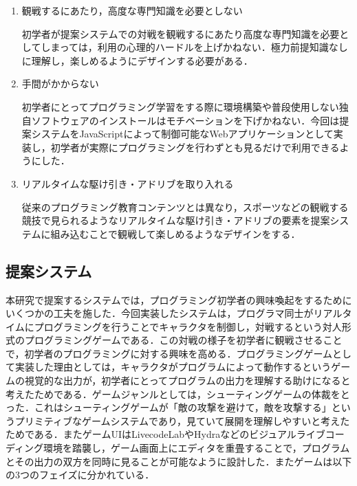 \begin{enumerate}
	\item 観戦するにあたり，高度な専門知識を必要としない
	
	初学者が提案システムでの対戦を観戦するにあたり高度な専門知識を必要としてしまっては，利用の心理的ハードルを上げかねない．極力前提知識なしに理解し，楽しめるようにデザインする必要がある．
	
	\item 手間がかからない

	初学者にとってプログラミング学習をする際に環境構築や普段使用しない独自ソフトウェアのインストールはモチベーションを下げかねない．今回は提案システムをJavaScriptによって制御可能なWebアプリケーションとして実装し，初学者が実際にプログラミングを行わずとも見るだけで利用できるようにした．
	
	\item リアルタイムな駆け引き・アドリブを取り入れる

	従来のプログラミング教育コンテンツとは異なり，スポーツなどの観戦する競技で見られるようなリアルタイムな駆け引き・アドリブの要素を提案システムに組み込むことで観戦して楽しめるようなデザインをする．
\end{enumerate}

\subsection{提案システム}

本研究で提案するシステムでは，プログラミング初学者の興味喚起をするためにいくつかの工夫を施した．今回実装したシステムは，プログラマ同士がリアルタイムにプログラミングを行うことでキャラクタを制御し，対戦するという対人形式のプログラミングゲームである．この対戦の様子を初学者に観戦させることで，初学者のプログラミングに対する興味を高める．プログラミングゲームとして実装した理由としては，キャラクタがプログラムによって動作するというゲームの視覚的な出力が，初学者にとってプログラムの出力を理解する助けになると考えたためである．ゲームジャンルとしては，シューティングゲームの体裁をとった．これはシューティングゲームが「敵の攻撃を避けて，敵を攻撃する」というプリミティブなゲームシステムであり，見ていて展開を理解しやすいと考えたためである．またゲームUIはLivecodeLabやHydraなどのビジュアルライブコーディング環境を踏襲し，ゲーム画面上にエディタを重畳することで，プログラムとその出力の双方を同時に見ることが可能なように設計した．またゲームは以下の3つのフェイズに分かれている．

